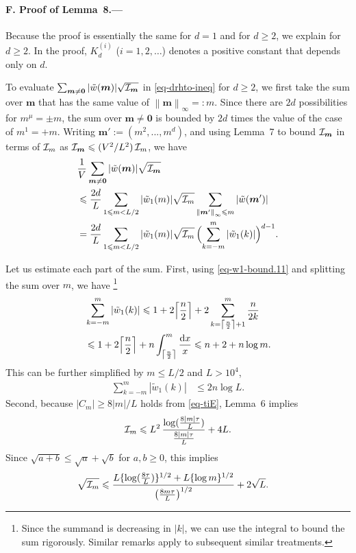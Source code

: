 \documentclass[aps,prl,superscriptaddress,reprint]{revtex4-2}
\newcommand{\se}[1]{\paragraph{#1.---}}
\newcommand*{\dd}{\mathop{}\!\mathrm{d}}
\theoremstyle{definition}
\newcommand{\abs}[1]{{\left\vert #1 \right\vert}}
\newcommand{\spp}[1]{^{(#1)}}
\newcommand{\Bigparen}[1]{\Bigl({#1}\Bigr)}
\newcommand{\nn}{\notag \\ }
\newcommand{\II}{{\cal I}}
\newcommand{\ti}{\tilde}
\newcommand{\m}{\mu}
\newcommand{\f}{\frac}
\newcommand{\ve}[1]{\boldsymbol{#1}}
\newcommand{\norminf}[1]{\left\|#1\right\|_\infty}
\renewcommand{\ge}{\geqslant}
\renewcommand{\geq}{\geqslant}
\renewcommand{\le}{\leqslant}
\renewcommand{\leq}{\leqslant}
\newcommand{\ceil}[1]{\left\lceil#1\right\rceil}
\newcommand{\Bigceil}[1]{\Bigl\lceil#1\Bigr\rceil}
\newcommand{\mm}{{\ve m}}
\newcommand{\zz}{{\ve 0}}
\begin{document}
\medskip

\se{F. Proof of Lemma~8}

Because the proof is essentially the same for $d=1$ and for $d \geq 2$, we
explain for $d \geq 2$.
In the proof, $K_d\spp i$ ($i=1, 2, \ldots$) denotes
a positive constant that depends only on $d$.


To evaluate
$\sum_{\mm\ne\zz}\abs{\ti w(\mm)}\sqrt{\II_\mm}$
in \eqref{eq-drhto-ineq} for $d \geq 2$,
we first take the sum over $\mm$ that has the same value of
$\norminf\mm=:m$.
Since there are
$2d$ possibilities for $m^\m=\pm m$,
the sum over $\mm\ne\zz$
is bounded by $2d$ times the value of
the case of $m^1=+m$.
Writing $\mm':=(m^2,...,m^d)$, and using Lemma~7 to
bound  $\II_\mm$ in terms of
$\II_m$ as $\II_\mm \leq (V^2/L^2) \, \II_m$,
we have
\begin{align}
  &
  \f1V\sum_{\mm\ne\zz}\abs{\ti w(\mm)}\sqrt{\II_\mm}
    \nn
  &\le \f{2d}L
    \sum_{1\le m<L/2}
    \abs{\ti w_1(m)}
    \sqrt{\II_m}
    \sum_{\norminf{\mm'}\le m}
    \abs{\ti w(\mm')}
    \nn
  &= \f{2d}L
    \sum_{1\le m<L/2}
    \abs{\ti w_1(m)}
    \sqrt{\II_m} \,
    \Bigparen{ \sum_{k=-m}^m \abs{\ti w_1(k)} }^{d-1}.
    \label{eq-sum-sep}
\end{align}

Let us estimate each part of the sum.
First, using \eqref{eq-w1-bound.11}
and
splitting the sum over $m$,
we
have
\footnote{Since the summand is decreasing in $|k|$, we can use the
integral to bound the sum rigorously.  Similar remarks apply to
subsequent similar treatments.}
\begin{align}
  &\sum_{k=-m}^m
    \abs{\ti w_1(k)}
    \le
    1+2\Bigceil{\f n2}+
    2\sum_{k=\ceil{\f n2}+1}^m \f n{2k}
    \nn
    &
    \leq
    1+2\Bigceil{\f n2} + n \int_{\ceil{\f n2}}^m\f{\dd x}x
      \le n+2+n\log m.
    \label{eq-sum-w}
\end{align}
This can be further simplified
by
$m \leq L/2$  and $L>10^4$,
\begin{align}
  \sum_{k=-m}^m
  \abs{\ti w_1(k)}
  &\leq
    2 n \log L.
    \label{eq-sum-w-simple}
\end{align}
Second, because $\abs{C_m} \geq 8|m|/L$ holds from \eqref{eq-tiE},
Lemma~6 implies
\begin{align}
	\II_m \leq
	L^2 \, \frac{\log (\frac{8 |m| \tau}{L})}{\frac{8 |m| \tau}{L}}
	+ 4L.
\end{align}
Since $\sqrt{a+b}\le\sqrt a+\sqrt b$
for $a,b\ge0$,
this implies
\begin{align}
  \sqrt{\II_m}
  	&\le
 	\frac{L \{\log (\frac{8 \tau}{L})\}^{1/2}
	+ L \{\log m\}^{1/2}}{\bigl (\frac{8 m \tau}{L} \bigr )^{1/2}}
  + 2 \sqrt{L} .
    \label{eq-sqrt-IIm}
\end{align}
\end{document}
